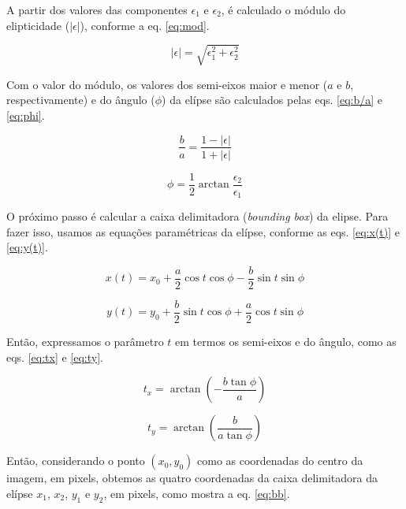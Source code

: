 A partir dos valores das componentes $\epsilon_1$ e $\epsilon_2$, é calculado o módulo do elipticidade ($|\epsilon|$), conforme a eq. \eqref{eq:mod}.

\begin{equation}\label{eq:mod}
  |\epsilon| = \sqrt{\epsilon_1^2 + \epsilon_2^2}
\end{equation}

Com o valor do módulo, os valores dos semi-eixos maior e menor ($a$ e $b$, respectivamente) e do ângulo ($\phi$) da elípse são calculados pelas eqs. \eqref{eq:b/a} e \eqref{eq:phi}.

\begin{equation}\label{eq:b/a}
  \frac{b}{a} = \frac{1 - |\epsilon|}{1 + |\epsilon|}
\end{equation}

\begin{equation}\label{eq:phi}
  \phi = \frac{1}{2}\arctan\frac{\epsilon_2}{\epsilon_1}
\end{equation}

O próximo passo é calcular a caixa delimitadora (\emph{bounding box}) da elipse. Para fazer isso, usamos as equações paramétricas da elípse, conforme as eqs. \eqref{eq:x(t)} e \eqref{eq:y(t)}.

\begin{equation}\label{eq:x(t)}
  x(t) = x_0 + \frac{a}{2} \cos t \cos\phi - \frac{b}{2} \sin t \sin\phi
\end{equation}

\begin{equation}\label{eq:y(t)}
  y(t) = y_0 + \frac{b}{2} \sin t \cos\phi + \frac{a}{2} \cos t \sin\phi
\end{equation}

Então, expressamos o parâmetro $t$ em termos os semi-eixos e do ângulo, como as eqs. \eqref{eq:tx} e \eqref{eq:ty}.

\begin{equation}\label{eq:tx}
  t_x = \arctan\left(-\frac{b\tan\phi}{a}\right)
\end{equation}

\begin{equation}\label{eq:ty}
  t_y = \arctan\left(\frac{b}{a\tan\phi}\right)
\end{equation}

Então, considerando o ponto $(x_0, y_0)$ como as coordenadas do centro da imagem, em pixels, obtemos as quatro coordenadas da caixa delimitadora da elípse $x_1$, $x_2$, $y_1$ e $y_2$, em pixels, como mostra a eq. \eqref{eq:bb}.

